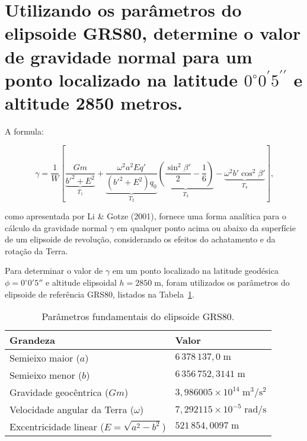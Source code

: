
\section{Utilizando os parâmetros do elipsoide GRS80, determine o valor de gravidade normal para um ponto localizado na latitude \(0^\circ 0^\prime 5^{\prime\prime}\) e altitude 2850 metros.}

A formula:


\[
\gamma = 
\frac{1}{W}
\left[
\underbrace{
\frac{Gm}{b'^2 + E^2}
}_{T_1}
+
\underbrace{
\frac{\omega^2 a^2 E q'}{(b'^2 + E^2) q_0}
}_{T_2}
\underbrace{
\left( \frac{\sin^2 \beta'}{2} - \frac{1}{6} \right)
}_{T_3}
-
\underbrace{
\omega^2 b' \cos^2 \beta'
}_{T_4}
\right]
\text{,}
\]



\noindent
como apresentada por Li \& Gotze (2001), fornece uma forma analítica para o cálculo da gravidade normal \(\gamma\) em qualquer ponto acima ou abaixo da superfície de um elipsoide de revolução, considerando os efeitos do achatamento e da rotação da Terra.



Para determinar o valor de \(\gamma\) em um ponto localizado na latitude geodésica \(\phi = 0^\circ 0' 5''\) e altitude elipsoidal \(h = 2850\;\text{m}\), foram utilizados os parâmetros do elipsoide de referência GRS80, listados na Tabela~\ref{tab:grs80}.

\begin{table}[h]
\centering
\caption{Parâmetros fundamentais do elipsoide GRS80.}
\label{tab:grs80}
\begin{tabular}{ll}
\toprule
Grandeza & Valor \\
\midrule
Semieixo maior (\(a\)) & \(6\,378\,137{,}0\;\text{m}\) \\
Semieixo menor (\(b\)) & \(6\,356\,752{,}3141\;\text{m}\) \\
Gravidade geocêntrica (\(Gm\)) & \(3{,}986005 \times 10^{14}\;\text{m}^3/\text{s}^2\) \\
Velocidade angular da Terra (\(\omega\)) & \(7{,}292115 \times 10^{-5}\;\text{rad/s}\) \\
Excentricidade linear (\(E = \sqrt{a^2 - b^2}\)) & \(521\,854{,}0097\;\text{m}\) \\
\bottomrule
\end{tabular}
\end{table}

